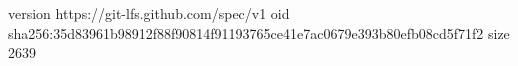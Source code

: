 version https://git-lfs.github.com/spec/v1
oid sha256:35d83961b98912f88f90814f91193765ce41e7ac0679e393b80efb08cd5f71f2
size 2639
